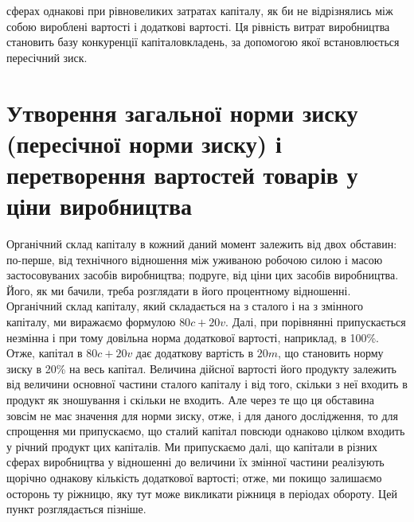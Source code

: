 \parcont{}  %
сферах однакові при рівновеликих затратах капіталу, як би не
відрізнялись між собою вироблені вартості і додаткові вартості.
Ця рівність витрат виробництва становить базу конкуренції капіталовкладень, за допомогою якої
встановлюється пересічний зиск.

\section{Утворення загальної норми зиску (пересічної норми зиску) і перетворення вартостей товарів у ціни
виробництва}

Органічний склад капіталу в кожний даний момент залежить
від двох обставин: по-перше, від технічного відношення між уживаною робочою силою і масою
застосовуваних засобів виробництва; подруге, від ціни цих засобів виробництва. Його, як ми бачили,
треба розглядати в його процентному відношенні. Органічний склад капіталу, який складається на  з
сталого і на  з змінного капіталу, ми виражаємо формулою $80 c + 20 v$. Далі, при
порівнянні припускається незмінна і при тому довільна норма
додаткової вартості, наприклад, в 100\%. Отже, капітал в $80 c + 20 v$ дає додаткову вартість в $20 m$,
що становить норму зиску
в 20\% на весь капітал. Величина дійсної вартості його продукту
залежить від величини основної частини сталого капіталу і від
того, скільки з неї входить в продукт як зношування і скільки
не входить. Але через те що ця обставина зовсім не має значення для норми зиску, отже, і для даного
дослідження, то для
спрощення ми припускаємо, що сталий капітал повсюди однаково цілком входить у річний продукт цих
капіталів. Ми припускаємо далі, що капітали в різних сферах виробництва у
відношенні до величини їх змінної частини реалізують щорічно
однакову кількість додаткової вартості; отже, ми покищо залишаємо осторонь ту ріжницю, яку тут може
викликати ріжниця
в періодах обороту. Цей пункт розглядається пізніше.

